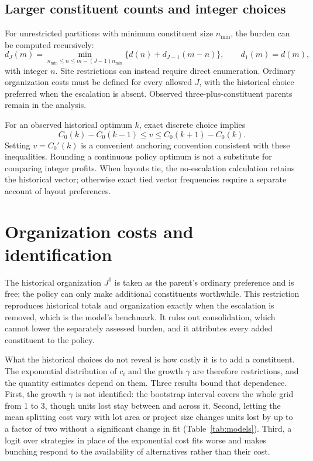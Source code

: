 \documentclass[11pt]{article}
\begin{document}
\subsection{Larger constituent counts and integer choices}
For unrestricted partitions with minimum constituent size $n_{\min}$, the burden can be computed recursively:
\begin{equation}
d_J(m)=\min_{n_{\min}\le n\le m-(J-1)n_{\min}}
\{d(n)+d_{J-1}(m-n)\},\qquad d_1(m)=d(m),
\end{equation}
with integer $n$. Site restrictions can instead require direct enumeration. Ordinary organization costs must be defined for every allowed $J$, with the historical choice preferred when the escalation is absent. Observed three-plus-constituent parents remain in the analysis.

For an observed historical optimum $k$, exact discrete choice implies
\begin{equation}
C_0(k)-C_0(k-1)\le v\le C_0(k+1)-C_0(k).
\end{equation}
Setting $v=C_0'(k)$ is a convenient anchoring convention consistent with these inequalities. Rounding a continuous policy optimum is not a substitute for comparing integer profits. When layouts tie, the no-escalation calculation retains the historical vector; otherwise exact tied vector frequencies require a separate account of layout preferences.

\section{Organization costs and identification}
\label{app:costs}

The historical organization $J^0$ is taken as the parent's ordinary preference and is free; the policy can only make additional constituents worthwhile. This restriction reproduces historical totals and organization exactly when the escalation is removed, which is the model's benchmark. It rules out consolidation, which cannot lower the separately assessed burden, and it attributes every added constituent to the policy.

What the historical choices do not reveal is how costly it is to add a constituent. The exponential distribution of $c_i$ and the growth $\gamma$ are therefore restrictions, and the quantity estimates depend on them. Three results bound that dependence. First, the growth $\gamma$ is not identified: the bootstrap interval covers the whole grid from 1 to 3, though units lost stay between \GammaUnitsLostLow{} and \GammaUnitsLostHigh{} across it. Second, letting the mean splitting cost vary with lot area or project size changes units lost by up to a factor of two without a significant change in fit (Table~\ref{tab:models}). Third, a logit over strategies in place of the exponential cost fits worse and makes bunching respond to the availability of alternatives rather than their cost.
\end{document}
